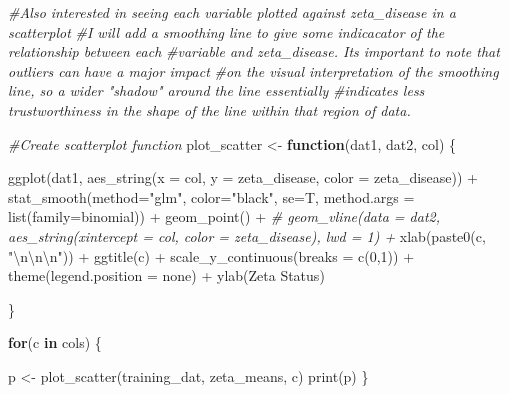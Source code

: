 \documentclass[
]{article}
\newenvironment{Shaded}{\begin{snugshade}}{\end{snugshade}}
\newcommand{\AttributeTok}[1]{\textcolor[rgb]{0.77,0.63,0.00}{#1}}
\newcommand{\CommentTok}[1]{\textcolor[rgb]{0.56,0.35,0.01}{\textit{#1}}}
\newcommand{\ControlFlowTok}[1]{\textcolor[rgb]{0.13,0.29,0.53}{\textbf{#1}}}
\newcommand{\DecValTok}[1]{\textcolor[rgb]{0.00,0.00,0.81}{#1}}
\newcommand{\FunctionTok}[1]{\textcolor[rgb]{0.00,0.00,0.00}{#1}}
\newcommand{\NormalTok}[1]{#1}
\newcommand{\OtherTok}[1]{\textcolor[rgb]{0.56,0.35,0.01}{#1}}
\newcommand{\SpecialCharTok}[1]{\textcolor[rgb]{0.00,0.00,0.00}{#1}}
\newcommand{\StringTok}[1]{\textcolor[rgb]{0.31,0.60,0.02}{#1}}
\begin{document}
\begin{Shaded}
\begin{Highlighting}[]
\CommentTok{\#Also interested in seeing each variable plotted against zeta\_disease in a scatterplot}
\CommentTok{\#I will add a smoothing line to give some indicacator of the relationship between each}
\CommentTok{\#variable and zeta\_disease. It\textquotesingle{}s important to note that outliers can have a major impact}
\CommentTok{\#on the visual interpretation of the smoothing line, so a wider "shadow" around the line essentially }
\CommentTok{\#indicates less trustworthiness in the shape of the line within that region of data.}

\CommentTok{\#Create scatterplot function}
\NormalTok{plot\_scatter }\OtherTok{\textless{}{-}} \ControlFlowTok{function}\NormalTok{(dat1, dat2, col) \{}
  
  \FunctionTok{ggplot}\NormalTok{(dat1, }\FunctionTok{aes\_string}\NormalTok{(}\AttributeTok{x =}\NormalTok{ col, }\AttributeTok{y =} \StringTok{\textquotesingle{}zeta\_disease\textquotesingle{}}\NormalTok{, }\AttributeTok{color =} \StringTok{\textquotesingle{}zeta\_disease\textquotesingle{}}\NormalTok{)) }\SpecialCharTok{+}
    \FunctionTok{stat\_smooth}\NormalTok{(}\AttributeTok{method=}\StringTok{"glm"}\NormalTok{, }\AttributeTok{color=}\StringTok{"black"}\NormalTok{, }\AttributeTok{se=}\NormalTok{T,}
                \AttributeTok{method.args =} \FunctionTok{list}\NormalTok{(}\AttributeTok{family=}\NormalTok{binomial)) }\SpecialCharTok{+}     \FunctionTok{geom\_point}\NormalTok{() }\SpecialCharTok{+}
    \CommentTok{\# geom\_vline(data = dat2, aes\_string(xintercept = col, color = \textquotesingle{}zeta\_disease\textquotesingle{}), lwd = 1) +}
    \FunctionTok{xlab}\NormalTok{(}\FunctionTok{paste0}\NormalTok{(c, }\StringTok{"}\SpecialCharTok{\textbackslash{}n\textbackslash{}n\textbackslash{}n}\StringTok{"}\NormalTok{)) }\SpecialCharTok{+}
    \FunctionTok{ggtitle}\NormalTok{(c) }\SpecialCharTok{+}
    \FunctionTok{scale\_y\_continuous}\NormalTok{(}\AttributeTok{breaks =} \FunctionTok{c}\NormalTok{(}\DecValTok{0}\NormalTok{,}\DecValTok{1}\NormalTok{)) }\SpecialCharTok{+}
    \FunctionTok{theme}\NormalTok{(}\AttributeTok{legend.position =} \StringTok{\textquotesingle{}none\textquotesingle{}}\NormalTok{) }\SpecialCharTok{+}
    \FunctionTok{ylab}\NormalTok{(}\StringTok{\textquotesingle{}Zeta Status\textquotesingle{}}\NormalTok{)}
  
  
  
\NormalTok{\}}



\ControlFlowTok{for}\NormalTok{(c }\ControlFlowTok{in}\NormalTok{ cols) \{}
  
\NormalTok{  p }\OtherTok{\textless{}{-}} \FunctionTok{plot\_scatter}\NormalTok{(training\_dat, zeta\_means, c)}
  \FunctionTok{print}\NormalTok{(p)}
\NormalTok{\}}
\end{Highlighting}
\end{Shaded}
\end{document}
